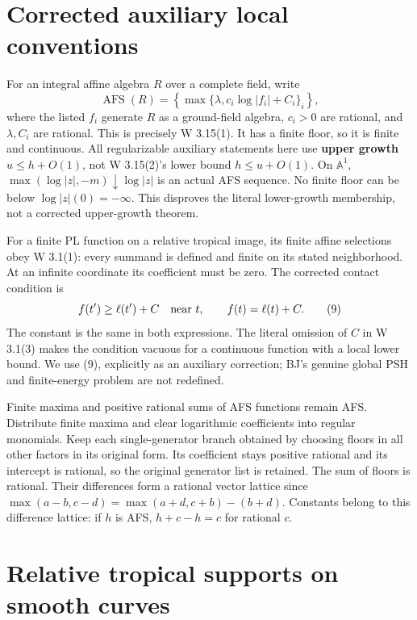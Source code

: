 \documentclass[
  11pt,
]{article}
\begin{document}
\section{Corrected auxiliary local
conventions}\label{corrected-auxiliary-local-conventions}

For an integral affine algebra \(R\) over a complete field, write
\[\operatorname{AFS}(R)=\left\{\max\{\lambda,c_i\log|f_i|+C_i\}_i\right\},\]
where the listed \(f_i\) generate \(R\) as a ground-field algebra,
\(c_i>0\) are rational, and \(\lambda,C_i\) are rational. This is
precisely W 3.15(1). It has a finite floor, so it is finite and
continuous. All regularizable auxiliary statements here use
\textbf{upper growth} \(u\le h+O(1)\), not W 3.15(2)'s lower bound
\(h\le u+O(1)\). On \(\mathbb A^1\),
\(\max(\log|z|,-m)\downarrow\log|z|\) is an actual AFS sequence. No
finite floor can be below \(\log|z|(0)=-\infty\). This disproves the
literal lower-growth membership, not a corrected upper-growth theorem.

For a finite PL function on a relative tropical image, its finite affine
selections obey W 3.1(1): every summand is defined and finite on its
stated neighborhood. At an infinite coordinate its coefficient must be
zero. The corrected contact condition is
\[f(t')\ge\ell(t')+C\quad\hbox{near }t,\qquad f(t)=\ell(t)+C.              \tag{9}\]
The constant is the same in both expressions. The literal omission of
\(C\) in W 3.1(3) makes the condition vacuous for a continuous function
with a local lower bound. We use (9), explicitly as an auxiliary
correction; BJ's genuine global PSH and finite-energy problem are not
redefined.

Finite maxima and positive rational sums of AFS functions remain AFS.
Distribute finite maxima and clear logarithmic coefficients into regular
monomials. Keep each single-generator branch obtained by choosing floors
in all other factors in its original form. Its coefficient stays
positive rational and its intercept is rational, so the original
generator list is retained. The sum of floors is rational. Their
differences form a rational vector lattice since
\(\max(a-b,c-d)=\max(a+d,c+b)-(b+d)\). Constants belong to this
difference lattice: if \(h\) is AFS, \(h+c-h=c\) for rational \(c\).

\section{Relative tropical supports on smooth
curves}\label{relative-tropical-supports-on-smooth-curves}
\end{document}
